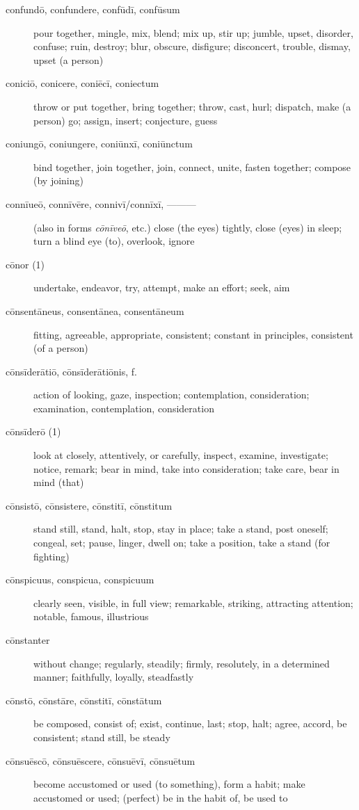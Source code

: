 \begin{description}
    \item[confundō, confundere, confūdī, confūsum] pour together, mingle, mix, blend; mix up, stir up; jumble, upset, disorder, confuse; ruin, destroy; blur, obscure, disfigure; disconcert, trouble, dismay, upset (a person)
    \item[coniciō, conicere, coniēcī, coniectum] throw or put together, bring together; throw, cast, hurl; dispatch, make (a person) go; assign, insert; conjecture, guess
    \item[coniungō, coniungere, coniūnxī, coniūnctum] bind together, join together, join, connect, unite, fasten together; compose (by joining)
    \item[connīueō, connīvēre, connivī/connīxī, ———] (also in forms \textit{cōnīveō}, etc.) close (the eyes) tightly, close (eyes) in sleep; turn a blind eye (to), overlook, ignore
    \item[cōnor (1)] undertake, endeavor, try, attempt, make an effort; seek, aim
    \item[cōnsentāneus, consentānea, consentāneum] fitting, agreeable, appropriate, consistent; constant in principles, consistent (of a person)
    \item[cōnsīderātiō, cōnsīderātiōnis, f.] action of looking, gaze, inspection; contemplation, consideration; examination, contemplation, consideration
    \item[cōnsīderō (1)] look at closely, attentively, or carefully, inspect, examine, investigate; notice, remark; bear in mind, take into consideration; take care, bear in mind (that)
    \item[cōnsistō, cōnsistere, cōnstitī, cōnstitum] \marginnote{*}stand still, stand, halt, stop, stay in place; take a stand, post oneself; congeal, set; pause, linger, dwell on; take a position, take a stand (for fighting)
    \item[cōnspicuus, conspicua, conspicuum] clearly seen, visible, in full view; remarkable, striking, attracting attention; notable, famous, illustrious
    \item[cōnstanter] without change; regularly, steadily; firmly, resolutely, in a determined manner; faithfully, loyally, steadfastly
    \item[cōnstō, cōnstāre, cōnstitī, cōnstātum] \marginnote{*}be composed, consist of; exist, continue, last; stop, halt; agree, accord, be consistent; stand still, be steady
    \item[cōnsuēscō, cōnsuēscere, cōnsuēvī, cōnsuētum]  become accustomed or used (to something), form a habit; make accustomed or used; (perfect) be in the habit of, be used to

\end{description}
